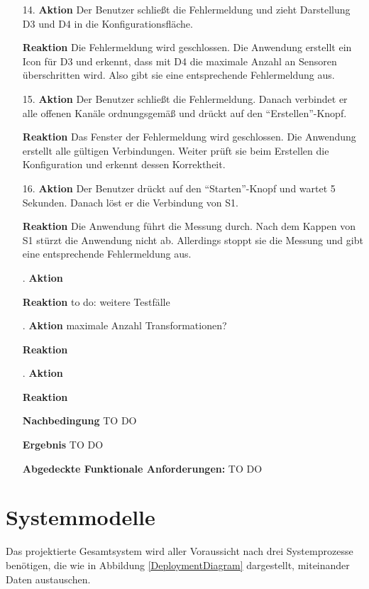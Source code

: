 \documentclass[parskip=full]{scrartcl}
\begin{document}
\begin{itemize}
\begin{itemize}
\item [14.]\textbf{Aktion} Der Benutzer schließt die Fehlermeldung und zieht Darstellung D3 und D4 in die Konfigurationsfläche.
\item []\textbf{Reaktion} Die Fehlermeldung wird geschlossen. Die Anwendung erstellt ein Icon für D3 und erkennt, dass mit D4 die maximale Anzahl an Sensoren überschritten wird. Also gibt sie eine entsprechende Fehlermeldung aus.
\item [15.]\textbf{Aktion} Der Benutzer schließt die Fehlermeldung. Danach verbindet er alle offenen Kanäle ordnungsgemäß und drückt auf den "`Erstellen"'-Knopf.
\item []\textbf{Reaktion} Das Fenster der Fehlermeldung wird geschlossen. Die Anwendung erstellt alle gültigen Verbindungen. Weiter prüft sie beim Erstellen die Konfiguration und erkennt dessen Korrektheit. 
\item [16.]\textbf{Aktion} Der Benutzer drückt auf den "`Starten"'-Knopf und wartet 5 Sekunden. Danach löst er die Verbindung von S1.
\item []\textbf{Reaktion} Die Anwendung führt die Messung durch. Nach dem Kappen von S1 stürzt die Anwendung nicht ab. Allerdings stoppt sie die Messung und gibt eine entsprechende Fehlermeldung aus. 
\item [.]\textbf{Aktion} 
\item []\textbf{Reaktion} to do: weitere Testfälle
\item [.]\textbf{Aktion} maximale Anzahl Transformationen?
\item []\textbf{Reaktion}
\item [.]\textbf{Aktion} 
\item []\textbf{Reaktion}

\item []\textbf{Nachbedingung} TO DO
\item []\textbf{Ergebnis} TO DO

\item []\textbf{Abgedeckte Funktionale Anforderungen:} TO DO

\end{itemize}


\end{itemize}

\section{Systemmodelle}\label{systemmodell}

Das projektierte Gesamtsystem wird aller Voraussicht nach drei Systemprozesse benötigen, die wie in Abbildung \ref{DeploymentDiagram} dargestellt, miteinander Daten austauschen.
\end{document}
